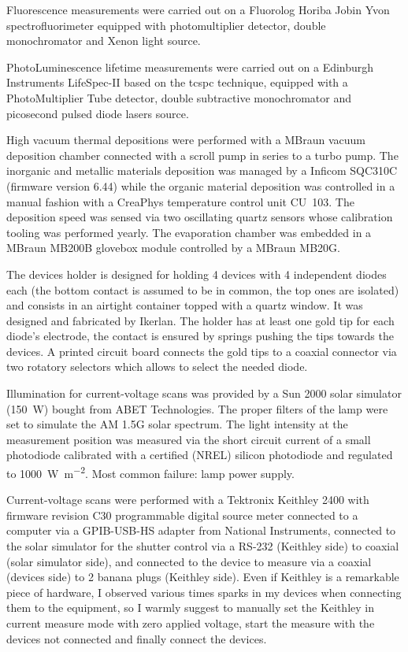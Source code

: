 	 Fluorescence measurements were carried out on a Fluorolog Horiba Jobin Yvon spectrofluorimeter equipped with photomultiplier detector, double monochromator and	Xenon light source.

	 PhotoLuminescence lifetime measurements were carried out on a Edinburgh Instruments LifeSpec-II based on the \gls{tcspc} technique, equipped with a PhotoMultiplier Tube detector, double subtractive monochromator and picosecond pulsed diode lasers source.
	
	 High vacuum thermal depositions were performed with a MBraun vacuum deposition chamber connected with a scroll pump in series to a turbo pump. The inorganic and metallic materials deposition was managed by a Inficom SQC310C (firmware version 6.44) while the organic material deposition was controlled in a manual fashion with a CreaPhys temperature control unit CU~103. The deposition speed was sensed via two oscillating quartz sensors whose calibration tooling was performed yearly. The evaporation chamber was embedded in a MBraun MB200B glovebox module controlled by a MBraun MB20G.

	 The devices holder is designed for holding 4 devices with 4 independent diodes each (the bottom contact is assumed to be in common, the top ones are isolated) and consists in an airtight container topped with a quartz window. It was designed and fabricated by Ikerlan. The holder has at least one gold tip for each diode's electrode, the contact is ensured by springs pushing the tips towards the devices. A printed circuit board connects the gold tips to a coaxial connector via two rotatory selectors which allows to select the needed diode.

	\label{solarsimulator}Illumination for current-voltage scans was provided by a Sun 2000 solar simulator (\SI{150}{\W}) bought from ABET Technologies. The proper filters of the lamp were set to simulate the AM 1.5G solar spectrum. The light intensity at the measurement position was measured via the short circuit current of a small photodiode calibrated with a certified (NREL) silicon photodiode and regulated to \SI{1000}{\W\per\m\squared}. Most common failure: lamp power supply.

	 Current-voltage scans were performed with a Tektronix Keithley 2400 with firmware revision C30 programmable digital source meter connected to a computer via a GPIB-USB-HS adapter from National Instruments, connected to the solar simulator for the shutter control via a RS-232 (Keithley side) to coaxial (solar simulator side), and connected to the device to measure via a coaxial (devices side) to 2 banana plugs (Keithley side). Even if Keithley is a remarkable piece of hardware, I observed various times sparks in my devices when connecting them to the equipment, so I warmly suggest to manually set the Keithley in current measure mode with zero applied voltage, start the measure with the devices not connected and finally connect the devices.

